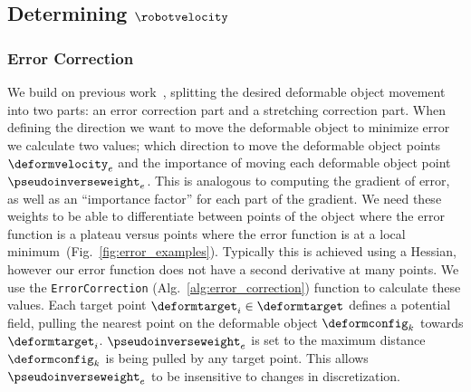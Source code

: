 \subsection{Determining $\robotvelocity$}
\label{sec:desired_direction}








\subsubsection{Error Correction}

We build on previous work~\cite{Berenson2013}, splitting the desired deformable object movement into two parts: an error correction part and a stretching correction part. When defining the direction we want to move the deformable object to minimize error we calculate two values; which direction to move the deformable object points $\deformvelocity_e$ and the importance of moving each deformable object point $\pseudoinverseweight_e$. This is analogous to computing the gradient of error, as well as an ``importance factor'' for each part of the gradient. We need these weights to be able to differentiate between points of the object where the error function is a plateau versus points where the error function is at a local minimum~(Fig.~\ref{fig:error_examples}). Typically this is achieved using a Hessian, however our error function does not have a second derivative at many points. We use the \texttt{ErrorCorrection} (Alg.~\ref{alg:error_correction}) function to calculate these values. Each target point $\deformtarget_i \in \deformtarget$ defines a potential field, pulling the nearest point on the deformable object $\deformconfig_k$ towards $\deformtarget_i$. $\pseudoinverseweight_e$ is set to the maximum distance $\deformconfig_k$ is being pulled by any target point. This allows $\pseudoinverseweight_e$ to be insensitive to changes in discretization.


